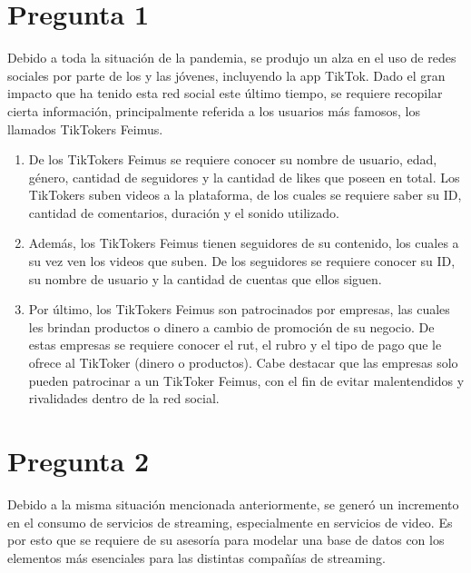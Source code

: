 \documentclass[letterpaper]{article}
\begin{document}
\section{Pregunta 1}

Debido a toda la situación de la pandemia, se produjo un alza en el uso de redes sociales por parte de los y las jóvenes, incluyendo la app TikTok. Dado el gran impacto que ha tenido esta red social este último tiempo, se requiere recopilar cierta información, principalmente referida a los usuarios más famosos, los llamados TikTokers Feimus.

\begin{enumerate}

\item	De los TikTokers Feimus se requiere conocer su nombre de usuario, edad, género, cantidad de seguidores y la cantidad de likes que poseen en total. Los TikTokers suben videos a la plataforma, de los cuales se requiere saber su ID, cantidad de comentarios, duración y el sonido utilizado.
 

\item	Además, los TikTokers Feimus tienen seguidores de su contenido, los cuales a su vez ven los videos que suben. De los seguidores se requiere conocer su ID, su nombre de usuario y la cantidad de cuentas que ellos siguen.
 

\item	Por último, los TikTokers Feimus son patrocinados por empresas, las cuales les brindan productos o dinero a cambio de promoción de su negocio. De estas empresas se requiere conocer el rut, el rubro y el tipo de pago que le ofrece al TikToker (dinero o productos). Cabe destacar que las empresas solo pueden patrocinar a un TikToker Feimus, con el fin de evitar malentendidos y rivalidades dentro de la red social.
 
\end{enumerate}

\section{Pregunta 2}

Debido a la misma situación mencionada anteriormente, se generó un incremento en el consumo de servicios de streaming, especialmente en servicios de video. Es por esto que se requiere de su asesoría para modelar una base de datos con los elementos más esenciales para las distintas compañías de streaming.
\end{document}

